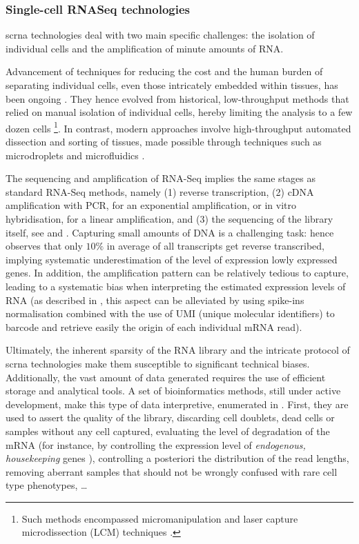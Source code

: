 \subsubsection{Single-cell RNASeq technologies}
\label{subsec:sc-rnaseq}

\acrshort{scrna} technologies deal with two main specific challenges: the isolation of individual cells and the amplification of minute amounts of RNA.  

Advancement of techniques for reducing the cost and the human burden of separating individual cells, even those intricately embedded within tissues, has been ongoing \autocite{fan_etal15}. They hence evolved from historical, low-throughput methods that relied on manual isolation of individual cells, hereby limiting the analysis to a few dozen cells \footnote{Such methods encompassed micromanipulation \autocite{tang_etal09} and laser capture microdissection (LCM) techniques \autocite{gautam_etal21}.}. In contrast, modern approaches involve high-throughput automated dissection and sorting of tissues, made possible through techniques such as microdroplets \autocite{bageritz_raddi19} and microfluidics \autocite{sarma_etal19}.

The sequencing and amplification of \acrshort{RNA-Seq} implies the same stages as standard \acrshort{RNA-Seq} methods, namely (1) reverse transcription, (2) cDNA amplification with PCR, for an exponential amplification, or in vitro hybridisation, for a linear amplification, and (3) the sequencing of the library itself, see  and . Capturing small amounts of DNA is a challenging task:  \autocite{islam_etal14} hence observes that only $10\%$ in average of all transcripts get reverse transcribed, implying systematic underestimation of the level of expression lowly expressed genes. In addition, the amplification pattern can be relatively tedious to capture, leading to a systematic bias when interpreting the estimated expression levels of RNA (as described in , this aspect can be alleviated by using \glspl{spike-in} normalisation combined with the use of UMI (unique molecular identifiers) to barcode and retrieve easily the origin of each individual mRNA read). 

Ultimately, the inherent sparsity of the RNA library and the intricate protocol of \acrshort{scrna} technologies make them susceptible to significant technical biases. Additionally, the vast amount of data generated requires the use of efficient storage and analytical tools. 
A set of bioinformatics methods, still under active development, make this type of data interpretive, enumerated in . First, they are used to assert the quality of the library, discarding cell doublets, dead cells or samples without any cell captured, evaluating the level of degradation of the mRNA (for instance, by controlling the expression level of \emph{endogenous, housekeeping} genes \autocite{shalek_etal14}), controlling a posteriori the distribution of the read lengths, removing aberrant samples that should not be wrongly confused with rare cell type phenotypes, \ldots
 

